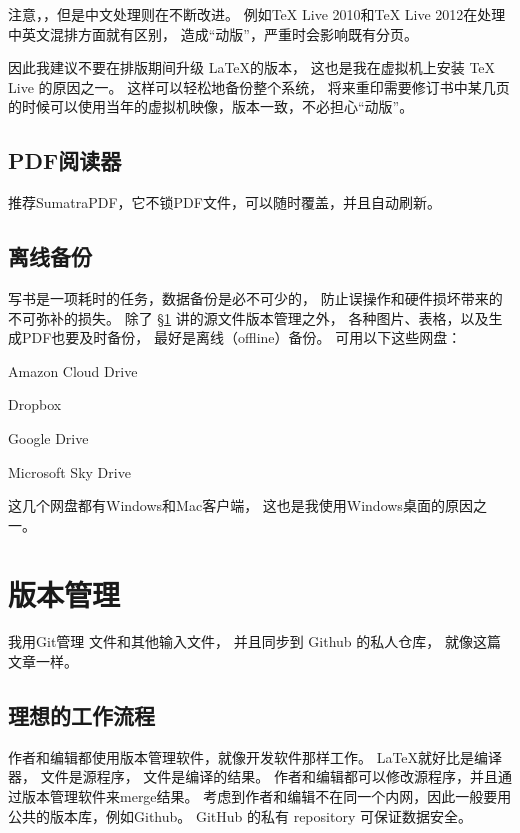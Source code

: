 注意，，但是中文处理则在不断改进。
例如TeX Live 2010和TeX Live 2012在处理中英文混排方面就有区别，
造成“动版”，严重时会影响既有分页。

\vspace{1ex}
\centerline{}

\vspace{1ex}
\centerline{}

\vspace{1ex}
因此我建议不要在排版期间升级 \LaTeX 的版本，
这也是我在虚拟机上安装 TeX Live 的原因之一。
这样可以轻松地备份整个系统，
将来重印需要修订书中某几页的时候可以使用当年的虚拟机映像，版本一致，不必担心“动版”。

\subsection{PDF阅读器}
推荐SumatraPDF，它不锁PDF文件，可以随时覆盖，并且自动刷新。

\subsection{离线备份}
写书是一项耗时的任务，数据备份是必不可少的，
防止误操作和硬件损坏带来的不可弥补的损失。
除了 \S \ref{sec:versionControl} 讲的源文件版本管理之外，
各种图片、表格，以及生成PDF也要及时备份，
最好是离线（offline）备份。
可用以下这些网盘：

\begindot
\item Amazon Cloud Drive
\item Dropbox
\item Google Drive
\item Microsoft Sky Drive
\myenddot

这几个网盘都有Windows和Mac客户端，
这也是我使用Windows桌面的原因之一。

\section{版本管理}
\label{sec:versionControl}


我用Git管理  文件和其他输入文件，
并且同步到 Github 的私人仓库，
就像这篇文章一样。

\subsection{理想的工作流程}
作者和编辑都使用版本管理软件，就像开发软件那样工作。
\LaTeX 就好比是编译器，
 文件是源程序，
 文件是编译的结果。
作者和编辑都可以修改源程序，并且通过版本管理软件来merge结果。
考虑到作者和编辑不在同一个内网，因此一般要用公共的版本库，例如Github。
GitHub 的私有 repository 可保证数据安全。

